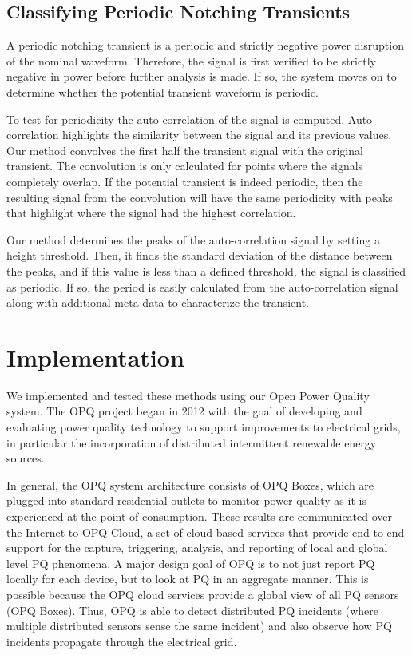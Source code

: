 \documentclass[10pt, conference, compsocconf]{IEEEtran}
\begin{document}
\subsection{Classifying Periodic Notching Transients}

A periodic notching transient is a periodic and strictly negative power disruption of the nominal waveform. Therefore, the signal is first verified to be strictly negative in power before further analysis is made. If so, the system moves on to determine whether the potential transient waveform is periodic.

To test for periodicity the auto-correlation of the signal is computed. Auto-correlation highlights the similarity between the signal and its previous values. Our method convolves the first half the transient signal with the original transient. The convolution is only calculated for points where the signals completely overlap. If the potential transient is indeed periodic, then the resulting signal from the convolution will have the same periodicity with peaks that highlight where the signal had the highest correlation.

Our method determines the peaks of the auto-correlation signal by setting a height threshold. Then, it finds the standard deviation of the distance between the peaks, and if this value is less than a defined threshold, the signal is classified as periodic. If so, the period is easily calculated from the auto-correlation signal along with additional meta-data to characterize the transient.

\section{Implementation}
\label{sec:Implementation}

We implemented and tested these methods using our Open Power Quality system.  The OPQ project began in 2012 with the goal of developing and evaluating power quality technology to support improvements to electrical grids, in particular the incorporation of distributed intermittent renewable energy sources.

In general, the OPQ system architecture consists of OPQ Boxes, which are plugged into standard residential outlets to monitor power quality as it is experienced at the point of consumption.  These results are communicated over the Internet to OPQ Cloud, a set of cloud-based services that provide end-to-end support for the capture, triggering, analysis, and reporting of local and global level PQ phenomena. A major design goal of OPQ is to not just report PQ locally for each device, but to look at PQ in an aggregate manner. This is possible because the OPQ cloud services provide a global view of all PQ sensors (OPQ Boxes). Thus, OPQ is able to detect distributed PQ incidents (where multiple distributed sensors sense the same incident) and also observe how PQ incidents propagate through the electrical grid.
\end{document}
